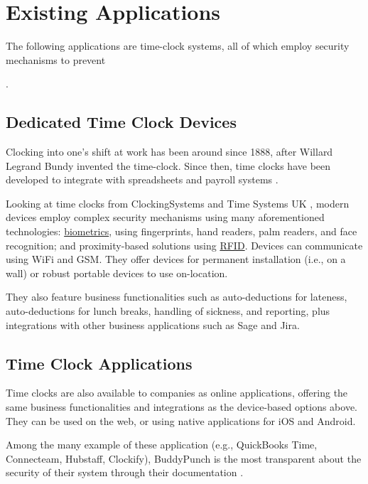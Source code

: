 \section{Existing Applications}

The following applications are \gls{time-clock} systems,
all of which employ security mechanisms to prevent

.

\subsection{Dedicated Time Clock Devices}

Clocking into one's shift at work has been around since
1888, after Willard Legrand Bundy invented the
\gls{time-clock}.
Since then, time clocks have been developed to integrate
with spreadsheets and payroll systems
\parencite{clockingHistory}.

Looking at time clocks from ClockingSystems
\parencite{clockingSystems} and Time Systems UK
\parencite{timeSystemsUk}, modern devices employ complex
security mechanisms using many aforementioned technologies:
\hyperref[ss:biometrics]{biometrics}, using fingerprints,
hand readers, palm readers, and face recognition; and
proximity-based solutions using \hyperref[ss:rfid]{RFID}.
Devices can communicate using WiFi and GSM.
They offer devices for permanent installation (i.e., on a
wall) or robust portable devices to use on-location.

They also feature business functionalities such as
auto-deductions for lateness, auto-deductions for lunch
breaks, handling of sickness, and reporting, plus
integrations with other business applications such as Sage
and Jira.

\subsection{Time Clock Applications}

Time clocks are also available to companies as online
applications, offering the same business functionalities
and integrations as the device-based options above.
They can be used on the web, or using native applications
for iOS and Android.

Among the many example of these application (e.g.,
QuickBooks Time, Connecteam, Hubstaff, Clockify),
BuddyPunch is the most transparent about the security of
their system through their documentation
\parencite{buddyPunchDocs}.


